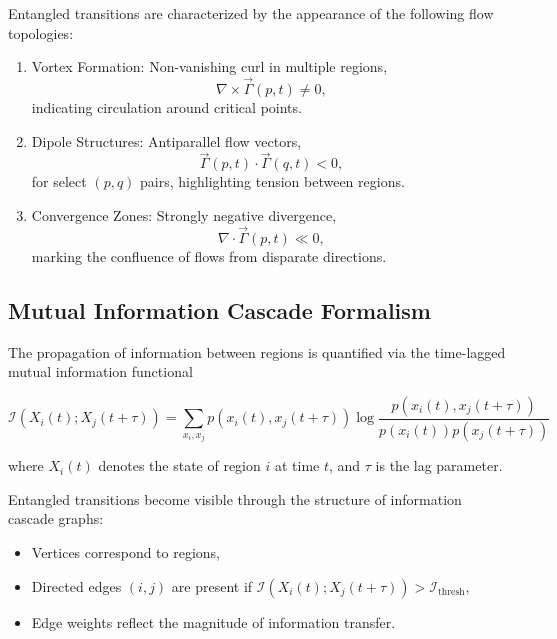 Entangled transitions are characterized by the appearance of the following flow topologies:

\begin{enumerate}
    \item Vortex Formation: Non-vanishing curl in multiple regions,
    \begin{equation}
    \nabla \times \vec{\Gamma}(p,t) \neq 0,
    \end{equation}
    indicating circulation around critical points.

    \item Dipole Structures: Antiparallel flow vectors,
    \begin{equation}
    \vec{\Gamma}(p,t) \cdot \vec{\Gamma}(q,t) < 0,
    \end{equation}
    for select \((p,q)\) pairs, highlighting tension between regions.

    \item Convergence Zones: Strongly negative divergence,
    \begin{equation}
    \nabla \cdot \vec{\Gamma}(p,t) \ll 0,
    \end{equation}
    marking the confluence of flows from disparate directions.
\end{enumerate}

\subsection{Mutual Information Cascade Formalism}

The propagation of information between regions is quantified via the time-lagged mutual information functional

\begin{equation}
\mathcal{I}(X_i(t); X_j(t+\tau)) = \sum_{x_i, x_j} p(x_i(t), x_j(t+\tau)) \log \frac{p(x_i(t), x_j(t+\tau))}{p(x_i(t))p(x_j(t+\tau))}
\end{equation}

where \(X_i(t)\) denotes the state of region \(i\) at time \(t\), and \(\tau\) is the lag parameter.

Entangled transitions become visible through the structure of information cascade graphs:
\begin{itemize}
    \item Vertices correspond to regions,
    \item Directed edges \((i,j)\) are present if \(\mathcal{I}(X_i(t); X_j(t+\tau)) > \mathcal{I}_{\text{thresh}}\),
    \item Edge weights reflect the magnitude of information transfer.
\end{itemize}


